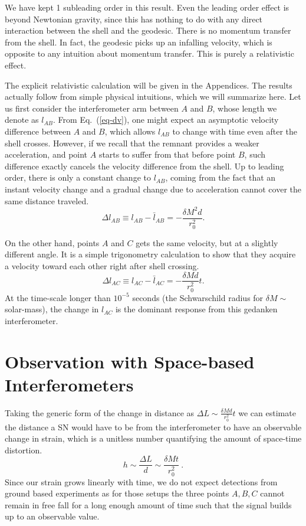 \documentclass[aps,showpacs,onecolumn,floats,prd,superscriptaddress,nofootinbib]{revtex4-1}
\begin{document}
We have kept 1 subleading order in this result.
Even the leading order effect is beyond Newtonian gravity, since this has nothing to do with any direct interaction between the shell and the geodesic.
There is no momentum transfer from the shell.
In fact, the geodesic picks up an infalling velocity, which is opposite to any intuition about momentum transfer.
This is purely a relativistic effect.

The explicit relativistic calculation will be given in the Appendices.
The results actually follow from simple physical intuitions, which we will summarize here.
Let us first consider the interferometer arm between $A$ and $B$, whose length we denote as $l_{AB}$.
From Eq.~(\ref{eq-dv}), one might expect an asymptotic velocity difference between $A$ and $B$, which allows $l_{AB}$ to change with time even after the shell crosses.
However, if we recall that the remnant provides a weaker acceleration, and point $A$ starts to suffer from that before point $B$, such difference exactly cancels the velocity difference from the shell.
Up to leading order, there is only a constant change to $l_{AB}$, coming from the fact that an instant velocity change and a gradual change due to acceleration cannot cover the same distance traveled.
\begin{equation}
	\Delta l_{AB} \equiv l_{AB} - \bar{l}_{AB} = - \frac{\delta M^2 d}{r_0^2}.
\end{equation}

On the other hand, points $A$ and $C$ gets the same velocity, but at a slightly different angle.
It is a simple trigonometry calculation to show that they acquire a velocity toward each other right after shell crossing.
\begin{equation}
	\Delta l_{AC} \equiv l_{AC} - \bar{l}_{AC} = - \frac{\delta M d}{r_0^2} t.
\end{equation}
At the time-scale longer than $10^{-5}$ seconds (the Schwarschild radius for $\delta M\sim$ solar-mass), the change in $l_{AC}$ is the dominant response from this gedanken interferometer.

\section{Observation with Space-based Interferometers}
\label{obs}
Taking the generic form of the change in distance as $\Delta L \sim \frac{\delta M d}{r_0^2} t$ we can estimate the distance a SN would have to be from the interferometer to have an observable change in strain, which is a unitless number quantifying the amount of space-time distortion.
\begin{equation}
h \sim \frac{\Delta L}{d} \sim \frac{\delta M t}{r_0^2}~.
\label{eq-strain}
\end{equation} 
Since our strain grows linearly with time, we do not expect detections from ground based experiments as for those setups the three points $A,B,C$ cannot remain in free fall for a long enough amount of time such that the signal builds up to an observable value. 
\end{document}
